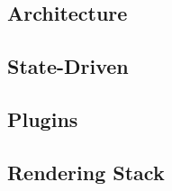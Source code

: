 \subsection{Architecture}

\subsection{State-Driven}
\subsection{Plugins}
\subsection{Rendering Stack}

